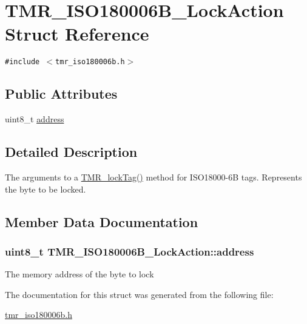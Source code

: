 \hypertarget{struct_t_m_r___i_s_o180006_b___lock_action}{
\section{TMR\_\-ISO180006B\_\-LockAction Struct Reference}
\label{struct_t_m_r___i_s_o180006_b___lock_action}
}
{\tt \#include $<$tmr\_\-iso180006b.h$>$}

\subsection*{Public Attributes}
\begin{CompactItemize}
\item 
uint8\_\-t \hyperlink{struct_t_m_r___i_s_o180006_b___lock_action_ece7afe086398beac262457b3739f43d}{address}
\end{CompactItemize}


\subsection{Detailed Description}
The arguments to a \hyperlink{group__reader_g8597458eb25df64f934016a89eac981c}{TMR\_\-lockTag()} method for ISO18000-6B tags. Represents the byte to be locked. 

\subsection{Member Data Documentation}
\hypertarget{struct_t_m_r___i_s_o180006_b___lock_action_ece7afe086398beac262457b3739f43d}{
\subsubsection[{address}]{\setlength{\rightskip}{0pt plus 5cm}uint8\_\-t {\bf TMR\_\-ISO180006B\_\-LockAction::address}}}
\label{struct_t_m_r___i_s_o180006_b___lock_action_ece7afe086398beac262457b3739f43d}


The memory address of the byte to lock 

The documentation for this struct was generated from the following file:\begin{CompactItemize}
\item 
\hyperlink{tmr__iso180006b_8h}{tmr\_\-iso180006b.h}\end{CompactItemize}
